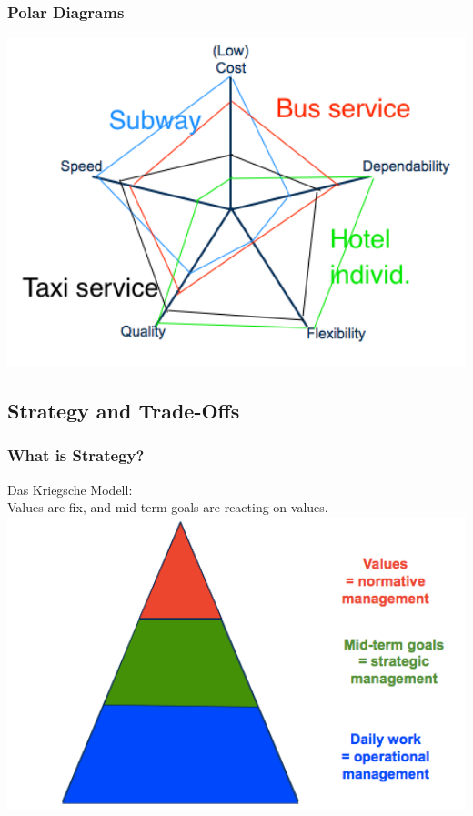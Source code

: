 \subsubsection{Polar Diagrams}
\includegraphics[width=1\textwidth]{W02/polar_diagramm}
\subsection{Strategy and Trade-Offs}
\subsubsection{What is Strategy? }\label{whatIsStrategy}
Das Kriegsche Modell:\\
Values are fix, and mid-term goals are reacting on values.\\
\includegraphics[width=1\textwidth]{W02/strategy}
